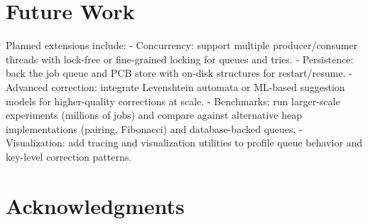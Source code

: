 \documentclass[conference,10pt]{IEEEtran}
\begin{document}
\section{Future Work}
Planned extensions include:
- Concurrency: support multiple producer/consumer threads with lock-free or fine-grained locking for queues and tries.
- Persistence: back the job queue and PCB store with on-disk structures for restart/resume.
- Advanced correction: integrate Levenshtein automata or ML-based suggestion models for higher-quality corrections at scale.
- Benchmarks: run larger-scale experiments (millions of jobs) and compare against alternative heap implementations (pairing, Fibonacci) and database-backed queues.
- Visualization: add tracing and visualization utilities to profile queue behavior and key-level correction patterns.

\section*{Acknowledgments}
\end{document}
